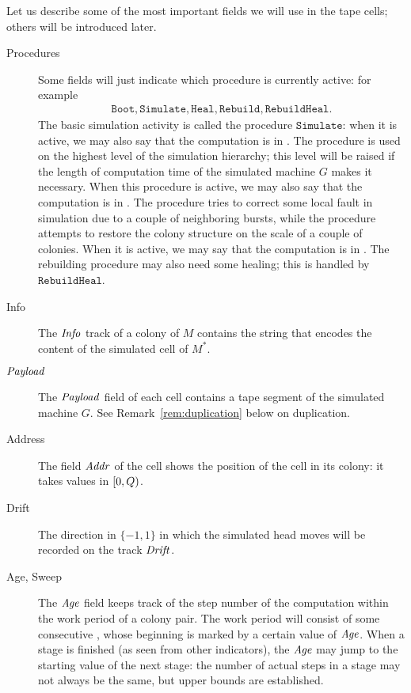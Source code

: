 \documentclass[11pt]{memoir}
\theoremstyle{definition} %
\newcommand{\fld}[1]{\ensuremath{\textit{#1\/}}}
\newcommand{\rul}[1]{\ensuremath{\texttt{#1}}}
\newcommand{\Q}{Q} %
\newcommand{\Addr}{\fld{Addr}}
\newcommand{\Age}{\fld{Age}} %
\newcommand{\Drift}{\fld{Drift}}
\newcommand{\Info}{\fld{Info}}
\newcommand{\Payload}{\fld{Payload}}
\newcommand{\rHeal}{\rul{Heal}}
\newcommand{\rBoot}{\rul{Boot}}
\newcommand{\rRebuild}{\rul{Rebuild}}
\newcommand{\rRebuildHeal}{\rul{RebuildHeal}}
\newcommand{\rSimulate}{\rul{Simulate}}
\begin{document}
Let us describe some of the most important fields we will use in the tape cells;
others will be introduced later.
\begin{description}
\item[Procedures]
  Some fields will just indicate which procedure is currently active:
  for example
  \begin{align*}
    \rBoot,\rSimulate,\rHeal,\rRebuild,\rRebuildHeal.
 \end{align*}
The basic simulation activity is called the procedure \( \rSimulate \): when it is active,
 we may also say that the computation is in .
The  procedure is used on the highest level of the simulation hierarchy; this level will be
raised if the length of computation time of the simulated machine \( G \) makes it necessary.
When this procedure is active,
we may also say that the computation is in .
The  procedure tries to correct some local fault in simulation due to a couple of neighboring
bursts, while the  procedure attempts to restore the colony structure
on the scale of a couple of colonies.
When it is active, we may say that the computation is in .
The rebuilding procedure may also need some healing; this is handled by \( \rRebuildHeal \).

\item[Info] The  \( \Info \) track of a colony of \( M \)
  contains the string that encodes the content of the simulated cell of \( M^{*} \).

\item[\( \Payload \)] The \( \Payload \)
  field of each cell contains a tape segment of the simulated machine \( G \).
  See Remark~\ref{rem:duplication} below on duplication.  

\item[Address] The field \( \Addr \)
of the cell shows the position of the cell in its colony:
it takes values in \( \lint{0}{\Q} \).

\item[Drift] The direction in \( \{-1,1\} \) in which the simulated head moves will be recorded on the track
 \( \Drift \).

\item[Age, Sweep] The \( \Age \)
  field keeps track of the step number of the computation within the work period of a colony pair.
  The work period will consist of some consecutive , whose beginning is marked by a certain
  value of \( \Age \).
  When a stage is finished (as seen from other indicators), the \( \Age \) may jump to the starting value of
  the next stage:
  the number of actual steps in a stage may not always be the same, but upper bounds are established.


\end{description}
\end{document}
